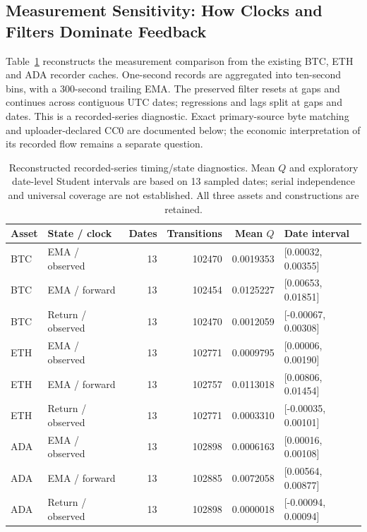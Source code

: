 \documentclass[12pt]{article}
\theoremstyle{definition}
\theoremstyle{remark}
\begin{document}
\subsection{Measurement Sensitivity: How Clocks and Filters Dominate Feedback}
\label{sec:measurement_sensitivity}
Table~\ref{tab:measurement_sensitivity} reconstructs the measurement comparison from the existing BTC, ETH and ADA recorder caches. One-second records are aggregated into ten-second bins, with a 300-second trailing EMA. The preserved filter resets at gaps and continues across contiguous UTC dates; regressions and lags split at gaps and dates. This is a recorded-series diagnostic. Exact primary-source byte matching and uploader-declared CC0 are documented below; the economic interpretation of its recorded flow remains a separate question.

\begin{table}[htbp]
\centering\footnotesize
\setlength{\tabcolsep}{3pt}
\caption{Reconstructed recorded-series timing/state diagnostics. Mean $Q$ and exploratory date-level Student intervals are based on 13 sampled dates; serial independence and universal coverage are not established. All three assets and constructions are retained.}
\label{tab:measurement_sensitivity}
\begin{tabular}{llrrrl}\toprule
Asset & State / clock & Dates & Transitions & Mean $Q$ & Date interval \\\midrule
BTC & EMA / observed & 13 & 102470 & 0.0019353 & [0.00032, 0.00355] \\
BTC & EMA / forward & 13 & 102454 & 0.0125227 & [0.00653, 0.01851] \\
BTC & Return / observed & 13 & 102470 & 0.0012059 & [-0.00067, 0.00308] \\
ETH & EMA / observed & 13 & 102771 & 0.0009795 & [0.00006, 0.00190] \\
ETH & EMA / forward & 13 & 102757 & 0.0113018 & [0.00806, 0.01454] \\
ETH & Return / observed & 13 & 102771 & 0.0003310 & [-0.00035, 0.00101] \\
ADA & EMA / observed & 13 & 102898 & 0.0006163 & [0.00016, 0.00108] \\
ADA & EMA / forward & 13 & 102885 & 0.0072058 & [0.00564, 0.00877] \\
ADA & Return / observed & 13 & 102898 & 0.0000018 & [-0.00094, 0.00094] \\
\bottomrule\end{tabular}
\end{table}
\end{document}

